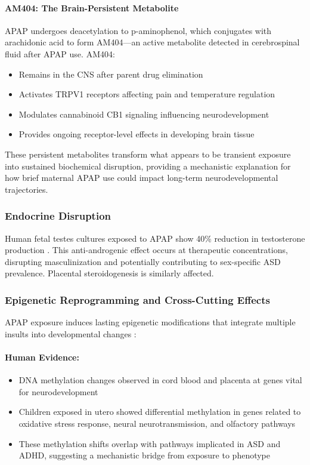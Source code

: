 \documentclass[11pt]{article}
\let\oldsubsubsection\subsubsection
\renewcommand{\subsubsection}[1]{\oldsubsubsection{#1}\setlength{\leftskip}{1.5em}}
\begin{document}
\paragraph{AM404: The Brain-Persistent Metabolite}
APAP undergoes deacetylation to p-aminophenol, which conjugates with arachidonic acid to form AM404—an active metabolite detected in cerebrospinal fluid after APAP use. AM404:
\begin{itemize}
\item Remains in the CNS after parent drug elimination
\item Activates TRPV1 receptors affecting pain and temperature regulation
\item Modulates cannabinoid CB1 signaling influencing neurodevelopment
\item Provides ongoing receptor-level effects in developing brain tissue
\end{itemize}

These persistent metabolites transform what appears to be transient exposure into sustained biochemical disruption, providing a mechanistic explanation for how brief maternal APAP use could impact long-term neurodevelopmental trajectories.

\subsubsection{Endocrine Disruption}
Human fetal testes cultures exposed to APAP show 40\% reduction in testosterone production \citep{kristensen2016,vanmaldergem2018}. This anti-androgenic effect occurs at therapeutic concentrations, disrupting masculinization and potentially contributing to sex-specific ASD prevalence. Placental steroidogenesis is similarly affected.

\subsubsection{Epigenetic Reprogramming and Cross-Cutting Effects}

APAP exposure induces lasting epigenetic modifications that integrate multiple insults into developmental changes \citep{zhu2021,liew2021}:

\paragraph{Human Evidence:}
\begin{itemize}
\item DNA methylation changes observed in cord blood and placenta at genes vital for neurodevelopment
\item Children exposed in utero showed differential methylation in genes related to oxidative stress response, neural neurotransmission, and olfactory pathways
\item These methylation shifts overlap with pathways implicated in ASD and ADHD, suggesting a mechanistic bridge from exposure to phenotype
\end{itemize}
\end{document}
